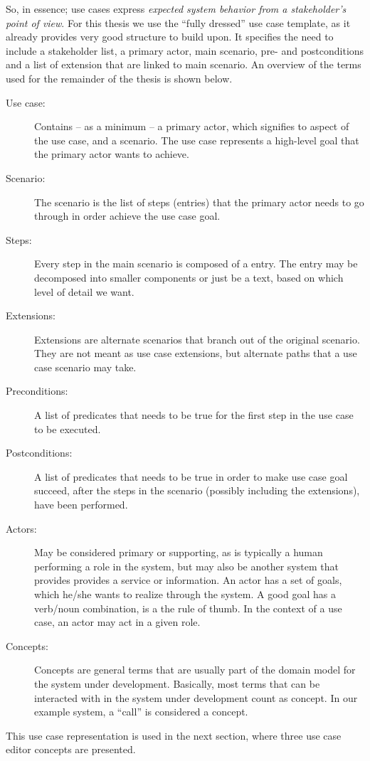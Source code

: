 \noindent So, in essence; use cases express \emph{expected system behavior from a stakeholder's point of view}. For this thesis we use the ``fully dressed'' use case template\cite{larman2005}, as it already provides very good structure to build upon. It specifies the need to include a stakeholder list, a primary actor, main scenario, pre- and postconditions and a list of extension that are linked to main scenario. An overview of the terms used for the remainder of the thesis is shown below.
\begin{description}

  \item[Use case:] Contains -- as a minimum -- a primary actor, which signifies to aspect of the use case, and a scenario. The use case represents a high-level goal that the primary actor wants to achieve.

  \item[Scenario:] The scenario is the list of steps (entries) that the primary actor needs to go through in order achieve the use case goal.

  \item[Steps:] Every step in the main scenario is composed of a entry. The entry may be decomposed into smaller components or just be a text, based on which level of detail we want. 

  \item[Extensions:] Extensions are alternate scenarios that branch out of the original scenario. They are not meant as use case extensions, but alternate paths that a use case scenario may take.

  \item[Preconditions:] A list of predicates that needs to be true for the first step in the use case to be executed.

  \item[Postconditions:] A list of predicates that needs to be true in order to make use case goal succeed, after the steps in the scenario (possibly including the extensions), have been performed.

  \item[Actors:] May be considered primary or supporting, as is typically a human performing a role in the system, but may also be another system that provides provides a service or information. An actor has a set of goals, which he/she wants to realize through the system. A good goal has a verb/noun combination, is a the rule of thumb. In the context of a use case, an actor may act in a given role.

  \item[Concepts:] Concepts are general terms that are usually part of the domain model for the system under development. Basically, most terms that can be interacted with in the system under development count as concept. In our example system, a ``call'' is considered a concept.

\end{description}
This use case representation is used in the next section, where three use case editor concepts are presented.




